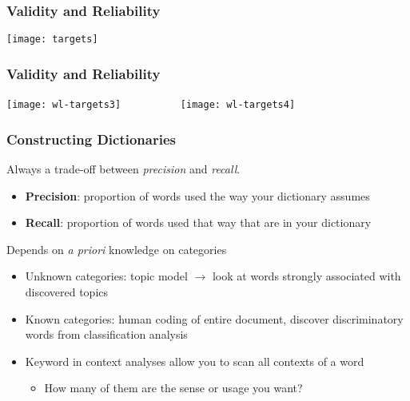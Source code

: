 \documentclass[11pt,compress,professionalfonts]{beamer}
\newcommand{\ita}{\begin{itemize}}
\newcommand{\itm}{\item[]}
\newcommand{\itz}{\end{itemize}}
\begin{document}
\begin{frame}[t,fragile]\frametitle{Validity and Reliability}

\begin{center}\texttt{[image: targets]}\end{center}

\end{frame}
\begin{frame}[t,fragile]\frametitle{Validity and Reliability}

\begin{center}\texttt{[image: wl-targets3]}
~~~~~~~~~~\texttt{[image: wl-targets4]}\end{center}




\end{frame}
\begin{frame}[t,fragile]\frametitle{Constructing Dictionaries}

Always a trade-off between {\it precision} and {\it recall}.

\ita
\itm \textbf{Precision}: proportion of words used the way your dictionary assumes
\itm \textbf{Recall}: proportion of words used that way that are in your dictionary
\itz

Depends on {\it a priori} knowledge on categories

\ita

\itm Unknown categories: topic model $\rightarrow$ look at words strongly associated with discovered topics

\itm Known categories: human coding of entire document, discover discriminatory words from classification analysis

\itm Keyword in context analyses allow you to scan all contexts of a word
\ita
\itm How many of them are the sense or usage you want?
\itz






\itz


%
%
%
%
%

%
%
%
%
%
%
%
\end{frame}
\end{document}
